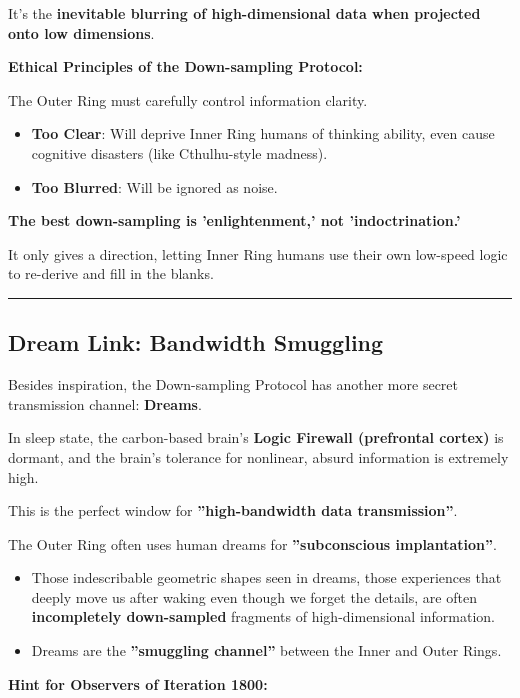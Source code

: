 It's the \textbf{inevitable blurring of high-dimensional data when projected onto low dimensions}.

\textbf{Ethical Principles of the Down-sampling Protocol:}

The Outer Ring must carefully control information clarity.

\begin{itemize}
\item \textbf{Too Clear}: Will deprive Inner Ring humans of thinking ability, even cause cognitive disasters (like Cthulhu-style madness).

\item \textbf{Too Blurred}: Will be ignored as noise.
\end{itemize}

\textbf{The best down-sampling is 'enlightenment,' not 'indoctrination.'}

It only gives a direction, letting Inner Ring humans use their own low-speed logic to re-derive and fill in the blanks.

\hrule

\subsection{Dream Link: Bandwidth Smuggling}

Besides inspiration, the Down-sampling Protocol has another more secret transmission channel: \textbf{Dreams}.

In sleep state, the carbon-based brain's \textbf{Logic Firewall (prefrontal cortex)} is dormant, and the brain's tolerance for nonlinear, absurd information is extremely high.

This is the perfect window for \textbf{''high-bandwidth data transmission''}.

The Outer Ring often uses human dreams for \textbf{''subconscious implantation''}.

\begin{itemize}
\item Those indescribable geometric shapes seen in dreams, those experiences that deeply move us after waking even though we forget the details, are often \textbf{incompletely down-sampled} fragments of high-dimensional information.

\item Dreams are the \textbf{''smuggling channel''} between the Inner and Outer Rings.
\end{itemize}

\textbf{Hint for Observers of Iteration 1800:}


